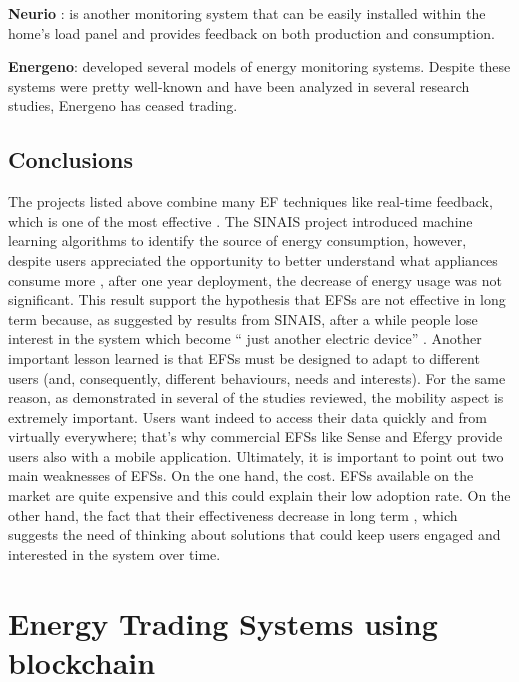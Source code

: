 \textbf{Neurio} \cite{neurio}: is another monitoring system that can be easily installed within the home’s load panel and provides feedback on both production and consumption.



\textbf{Energeno}: developed several models of energy monitoring systems. Despite these systems were pretty well-known and have been analyzed in several research studies, Energeno has ceased trading.


\subsection{Conclusions}

The projects listed above combine many \ac{EF} techniques like real-time feedback, which is one of the most effective \cite{Froehlich2010}. The \ac{SINAIS} project introduced machine learning algorithms to identify the source of energy consumption, however, despite users appreciated the opportunity to better understand what appliances consume more \cite{Pereira2013}, after one year deployment, the decrease of energy usage was not significant. This result support the hypothesis that \acp{EFS} are not effective in long term because, as suggested by results from \ac{SINAIS}, after a while people lose interest in the system which become “ just another electric device” \cite{Pereira2013}. Another important lesson learned is that \acp{EFS} must be designed to adapt to different users (and, consequently, different behaviours, needs and interests). For the same reason, as demonstrated in several of the studies reviewed, the mobility aspect is extremely important. Users want indeed to access their data quickly and from virtually everywhere; that’s why commercial \acp{EFS} like Sense and Efergy provide users also with a mobile application. Ultimately, it is important to point out two main weaknesses of \acp{EFS}. On the one hand, the cost. \acp{EFS} available on the market are quite expensive and this could explain their low adoption rate. On the other hand, the fact that their effectiveness decrease in long term \cite{Pereira2013}, which suggests the need of thinking about solutions that could keep users engaged and interested in the system over time. 



\section{Energy Trading Systems using blockchain} \label{sets}
